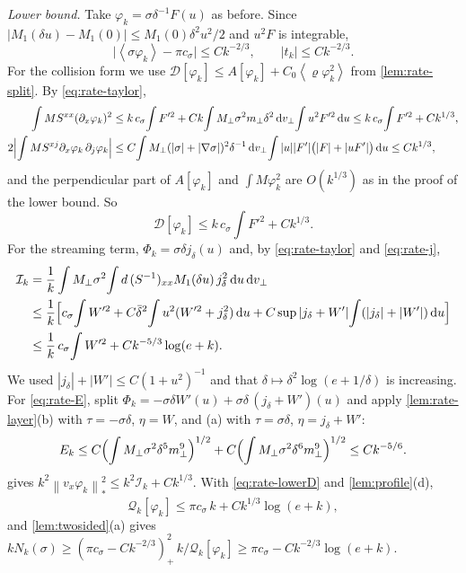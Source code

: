 \documentclass[11pt]{article}
\newcommand{\dd}{\,\mathrm d}
\newcommand{\av}[1]{\left\langle #1\right\rangle}
\newcommand{\D}{\mathcal D}
\newcommand{\nstar}[1]{\left\|#1\right\|_*}
\theoremstyle{definition}
\theoremstyle{remark}
\numberwithin{equation}{section}
\begin{document}
\emph{Lower bound.} Take $\varphi_k=\sigma\delta^{-1}F(u)$ as before. Since
$|M_1(\delta u)-M_1(0)|\leq M_1(0)\delta^2u^2/2$ and $u^2F$ is integrable,
\[
 \bigl|\av{\sigma\varphi_k}-\pi c_\sigma\bigr|\leq Ck^{-2/3},\qquad
 |t_k|\leq Ck^{-2/3}.
\]
For the collision form we use $\D[\varphi_k]\leq A[\varphi_k]
+C_0\av{\varrho\varphi_k^2}$ from \cref{lem:rate-split}. By
\eqref{eq:rate-taylor},
\begin{align*}
 \int MS^{xx}(\partial_x\varphi_k)^2
  &\leq k\,c_\sigma\!\int F'^2
   +Ck\!\int M_\perp\sigma^2m_\perp\delta^2\dd v_\perp\!\int u^2F'^2\dd u
   \leq k\,c_\sigma\!\int F'^2+Ck^{1/3},\\
 2\Bigl|\int MS^{xj}\partial_x\varphi_k\,\partial_j\varphi_k\Bigr|
  &\leq C\!\int M_\perp(|\sigma|+|\nabla\sigma|)^2\delta^{-1}\dd v_\perp
    \!\int|u||F'|\bigl(|F|+|uF'|\bigr)\dd u\leq Ck^{1/3},
\end{align*}
and the perpendicular part of $A[\varphi_k]$ and $\int M\varphi_k^2$ are
$O(k^{1/3})$ as in the proof of the lower bound. So
\begin{equation}
 \D[\varphi_k]\leq k\,c_\sigma\!\int F'^2+Ck^{1/3}.
 \label{eq:rate-lowerD}
\end{equation}
For the streaming term, $\Phi_k=\sigma\delta j_\delta(u)$ and, by
\eqref{eq:rate-taylor} and \eqref{eq:rate-j},
\begin{align*}
 \mathcal I_k&=\frac1k\int M_\perp\sigma^2\!\int d\,(S^{-1})_{xx}M_1(\delta u)\,
   j_\delta^2\dd u\dd v_\perp\\
 &\leq\frac1k\Bigl[c_\sigma\!\int W'^2
   +C\bar\delta^2\!\int u^2(W'^2+j_\delta^2)\dd u
   +C\sup|j_\delta+W'|\!\int(|j_\delta|+|W'|)\dd u\Bigr]\\
 &\leq\frac1k\,c_\sigma\!\int W'^2+Ck^{-5/3}\log(e+k).
\end{align*}
We used $|j_\delta|+|W'|\leq C(1+u^2)^{-1}$ and that
$\delta\mapsto\delta^2\log(e+1/\delta)$ is increasing. For
\eqref{eq:rate-E}, split
$\Phi_k=-\sigma\delta W'(u)+\sigma\delta\,(j_\delta+W')(u)$ and apply
\cref{lem:rate-layer}(b) with $\tau=-\sigma\delta$, $\eta=W$, and (a) with
$\tau=\sigma\delta$, $\eta=j_\delta+W'$:
\[
 E_k\leq C\Bigl(\int M_\perp\sigma^2\delta^5m_\perp^9\Bigr)^{1/2}
   +C\Bigl(\int M_\perp\sigma^2\delta^6m_\perp^9\Bigr)^{1/2}\leq Ck^{-5/6}.
\]
 gives
$k^2\nstar{v_x\varphi_k}^2\leq k^2\mathcal I_k+Ck^{1/3}$. With
\eqref{eq:rate-lowerD} and \cref{lem:profile}(d),
\[
 \mathcal Q_k[\varphi_k]\leq\pi c_\sigma\,k+Ck^{1/3}\log(e+k),
\]
and \cref{lem:twosided}(a) gives
$kN_k(\sigma)\geq(\pi c_\sigma-Ck^{-2/3})_+^2\,k/\mathcal Q_k[\varphi_k]
\geq\pi c_\sigma-Ck^{-2/3}\log(e+k)$.
\end{document}
